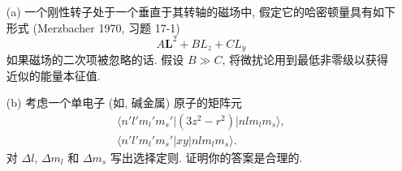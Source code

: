 \documentclass{assignment}
\begin{document}
\begin{prob}[课本习题 5.17]
    \begin{itemize}
        \item[(a)] 一个刚性转子处于一个垂直于其转轴的磁场中, 假定它的哈密顿量具有如下形式 (Merzbacher 1970, 习题 17-1)
        \[
            A\bm{L}^2+BL_z+CL_y
        \]
        如果磁场的二次项被忽略的话. 假设 $B\gg C$, 将微扰论用到最低非零级以获得近似的能量本征值.
        \item[(b)] 考虑一个单电子 (如, 碱金属) 原子的矩阵元
        \begin{gather*}
            \langle n'l'm_l'm_s'\rvert(3z^2-r^2)\lvert nlm_lm_s\rangle,\\
            \langle n'l'm_l'm_s'\rvert xy\lvert nlm_lm_s\rangle.
        \end{gather*}
        对 $\Delta l$, $\Delta m_l$ 和 $\Delta m_s$ 写出选择定则. 证明你的答案是合理的.
    \end{itemize}
\end{prob}
\end{document}
